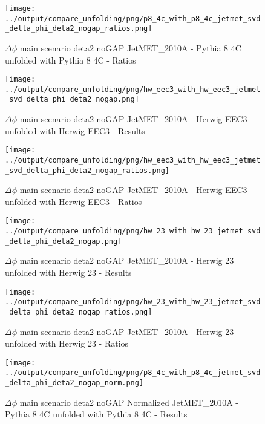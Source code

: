 \documentclass[11pt]{book}
\begin{document}
\begin{figure}[ht]
\centering
\texttt{[image: ../output/compare\_unfolding/png/p8\_4c\_with\_p8\_4c\_jetmet\_svd\_delta\_phi\_deta2\_nogap\_ratios.png]}
\caption{$\Delta\phi$ main scenario deta2 noGAP JetMET\_2010A - Pythia 8 4C unfolded with Pythia 8 4C - Ratios}
\label{p8_p8_jetmet_svd_delta_phi_deta2_nogap_b}
\end{figure}

\begin{figure}[ht]
\centering
\texttt{[image: ../output/compare\_unfolding/png/hw\_eec3\_with\_hw\_eec3\_jetmet\_svd\_delta\_phi\_deta2\_nogap.png]}
\caption{$\Delta\phi$ main scenario deta2 noGAP JetMET\_2010A - Herwig EEC3 unfolded with Herwig EEC3 - Results}
\label{hw_eec3_hw_eec3_jetmet_svd_delta_phi_deta2_nogap_a}
\end{figure}

\begin{figure}[ht]
\centering
\texttt{[image: ../output/compare\_unfolding/png/hw\_eec3\_with\_hw\_eec3\_jetmet\_svd\_delta\_phi\_deta2\_nogap\_ratios.png]}
\caption{$\Delta\phi$ main scenario deta2 noGAP JetMET\_2010A - Herwig EEC3 unfolded with Herwig EEC3 - Ratios}
\label{hw_eec3_hw_eec3_jetmet_svd_delta_phi_deta2_nogap_b}
\end{figure}

\begin{figure}[ht]
\centering
\texttt{[image: ../output/compare\_unfolding/png/hw\_23\_with\_hw\_23\_jetmet\_svd\_delta\_phi\_deta2\_nogap.png]}
\caption{$\Delta\phi$ main scenario deta2 noGAP JetMET\_2010A - Herwig 23 unfolded with Herwig 23 - Results}
\label{hw_23_hw_23_jetmet_svd_delta_phi_deta2_nogap_a}
\end{figure}

\begin{figure}[ht]
\centering
\texttt{[image: ../output/compare\_unfolding/png/hw\_23\_with\_hw\_23\_jetmet\_svd\_delta\_phi\_deta2\_nogap\_ratios.png]}
\caption{$\Delta\phi$ main scenario deta2 noGAP JetMET\_2010A - Herwig 23 unfolded with Herwig 23 - Ratios}
\label{hw_23_hw_23_jetmet_svd_delta_phi_deta2_nogap_b}
\end{figure}


\begin{figure}[ht]
\centering
\texttt{[image: ../output/compare\_unfolding/png/p8\_4c\_with\_p8\_4c\_jetmet\_svd\_delta\_phi\_deta2\_nogap\_norm.png]}
\caption{$\Delta\phi$ main scenario deta2 noGAP Normalized JetMET\_2010A - Pythia 8 4C unfolded with Pythia 8 4C - Results}
\label{p8_p8_jetmet_svd_delta_phi_deta2_nogap_norm_a}
\end{figure}
\end{document}
